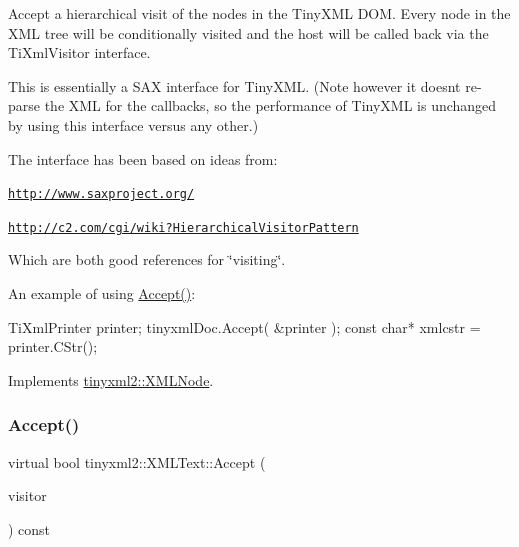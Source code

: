 Accept a hierarchical visit of the nodes in the Tiny\+X\+ML D\+OM. Every node in the X\+ML tree will be conditionally visited and the host will be called back via the Ti\+Xml\+Visitor interface.

This is essentially a S\+AX interface for Tiny\+X\+ML. (Note however it doesn\textquotesingle{}t re-\/parse the X\+ML for the callbacks, so the performance of Tiny\+X\+ML is unchanged by using this interface versus any other.)

The interface has been based on ideas from\+:


\begin{DoxyItemize}
\item \href{http://www.saxproject.org/}{\tt http\+://www.\+saxproject.\+org/}
\item \href{http://c2.com/cgi/wiki?HierarchicalVisitorPattern}{\tt http\+://c2.\+com/cgi/wiki?\+Hierarchical\+Visitor\+Pattern}
\end{DoxyItemize}

Which are both good references for \char`\"{}visiting\char`\"{}.

An example of using \hyperlink{classtinyxml2_1_1XMLText_a537c60d7e18fb59c45ac2737a29ac47a}{Accept()}\+: \begin{DoxyVerb}TiXmlPrinter printer;
tinyxmlDoc.Accept( &printer );
const char* xmlcstr = printer.CStr();
\end{DoxyVerb}
 

Implements \hyperlink{classtinyxml2_1_1XMLNode_a81e66df0a44c67a7af17f3b77a152785}{tinyxml2\+::\+X\+M\+L\+Node}.

\mbox{\label{classtinyxml2_1_1XMLText_a1b2c1448f1a21299d0a7913f18b55206}} 
\subsubsection{\texorpdfstring{Accept()}{Accept()}\hspace{0.1cm}{\footnotesize\ttfamily [2/2]}}
{\footnotesize\ttfamily virtual bool tinyxml2\+::\+X\+M\+L\+Text\+::\+Accept (\begin{DoxyParamCaption}\item[{\hyperlink{classtinyxml2_1_1XMLVisitor}{X\+M\+L\+Visitor} $\ast$}]{visitor }\end{DoxyParamCaption}) const\hspace{0.3cm}{\ttfamily [virtual]}}

